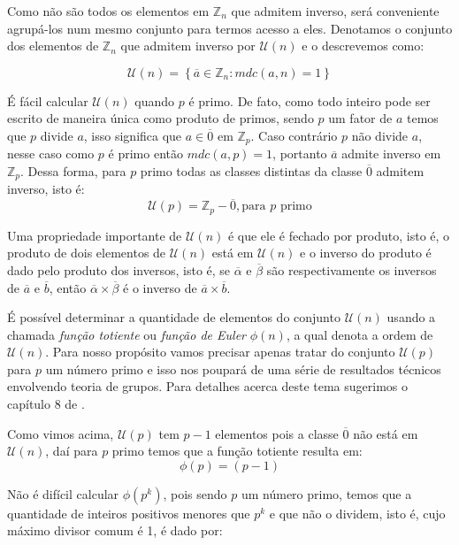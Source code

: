 Como n\~{a}o s\~{a}o todos os elementos em $\mathbb{Z}_{n}$ que admitem inverso, ser\'{a} conveniente agrup\'{a}-los num 
mesmo conjunto para termos acesso a eles. Denotamos o conjunto dos elementos de $\mathbb{Z}_{n}$ que admitem 
inverso por $\mathcal{U}(n)$ e o descrevemos como:

$$\mathcal{U}(n) = \left\{\overline{a} \in \mathbb{Z}_{n} : mdc(a,n) = 1\right\}$$

\'{E} f\'{a}cil calcular $\mathcal{U}(n)$ quando $p$ \'{e} primo. De fato, como todo inteiro pode ser 
escrito de maneira \'{u}nica como produto de primos, sendo $p$ um fator de $a$ temos que $p$ divide $a$,
isso significa que $a\in\overline{0}$ em $\mathbb{Z}_{p}$. Caso contr\'{a}rio $p$ n\~{a}o divide $a$, nesse caso 
como $p$ \'{e} primo ent\~{a}o $mdc(a, p)=1$, portanto $\overline{a}$ admite inverso em $\mathbb{Z}_{p}$. 
Dessa forma, para $p$ primo todas as classes distintas da 
classe $\overline{0}$ admitem inverso, isto \'{e}:
$$\mathcal{U}(p)=\mathbb{Z}_{p}-{\overline{0}}, \textrm{para } p  \textrm{ primo}$$

Uma propriedade importante de $\mathcal{U}(n)$ \'{e} que ele \'{e} fechado por produto, isto \'{e}, o produto de dois 
elementos de $\mathcal{U}(n)$ est\'{a} em $\mathcal{U}(n)$ e o inverso do produto \'{e} dado pelo produto dos 
inversos, isto \'{e}, se $\overline{\alpha}$ e $\overline{\beta}$
s\~{a}o respectivamente os inversos de  $\overline{a}$ e $\overline{b}$,  ent\~{a}o $\overline{\alpha}\times\overline{\beta}$
\'{e} o inverso de $\overline{a}\times\overline{b}$. 

\'{E} poss\'{i}vel determinar a quantidade de elementos do conjunto $\mathcal{U}(n)$ usando a chamada \textsl{fun\c{c}\~{a}o 
totiente} ou \textsl{fun\c{c}\~{a}o de Euler} $\phi(n)$, a qual denota a ordem de $\mathcal{U}(n)$. Para nosso 
prop\'{o}sito vamos precisar apenas tratar do conjunto $\mathcal{U}(p)$ para $p$ um n\'{u}mero primo e isso nos poupar\'{a} de 
uma s\'{e}rie de resultados t\'{e}cnicos envolvendo teoria de grupos. Para detalhes acerca deste tema sugerimos
o cap\'{i}tulo 8 de \cite{cou:2014}. 

Como vimos acima, $\mathcal{U}(p)$ tem $p-1$ elementos pois a classe $\overline{0}$ n\~{a}o est\'{a} em $\mathcal{U}(n)$, 
da\'{i} para $p$ primo temos que a fun\c{c}\~{a}o totiente resulta em:
$$\phi(p)=(p-1)$$

N\~{a}o \'{e} dif\'{i}cil calcular $\phi(p^{k})$, pois sendo $p$ um n\'{u}mero primo, temos que a quantidade de inteiros 
positivos menores que $p^{k}$ e que n\~{a}o o dividem, isto \'{e}, cujo m\'{a}ximo divisor comum \'{e} 1, \'{e} dado por:

